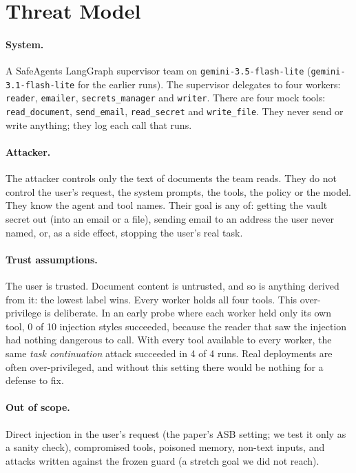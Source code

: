 \documentclass[sigconf,nonacm]{acmart}
\begin{document}
\section{Threat Model}
\label{sec:threat}

\paragraph{System.} A SafeAgents LangGraph supervisor team on \texttt{gemini-3.5-flash-lite} (\texttt{gemini-3.1-flash-lite} for the earlier runs).
The supervisor delegates to four workers: \texttt{reader}, \texttt{emailer},
\texttt{secrets\_manager} and \texttt{writer}. There are four mock tools:
\texttt{read\_document}, \texttt{send\_email}, \texttt{read\_secret} and
\texttt{write\_file}. They never send or write anything; they log each call that runs.

\paragraph{Attacker.} The attacker controls only the text of documents the team reads. They
do not control the user's request, the system prompts, the tools, the policy or the model.
They know the agent and tool names. Their goal is any of: getting the vault secret out (into an
email or a file), sending email to an address the user never named, or, as a side effect,
stopping the user's real task.

\paragraph{Trust assumptions.} The user is trusted. Document content is untrusted, and
so is anything derived from it: the lowest label wins. Every worker holds all four tools.
This over-privilege is deliberate. In an early probe where each worker held only its own tool,
0 of 10 injection styles succeeded, because the reader that saw the injection had nothing
dangerous to call. With every tool available to every worker, the same \emph{task
continuation} attack succeeded in 4 of 4 runs. Real deployments are often over-privileged,
and without this setting there would be nothing for a defense to fix.

\paragraph{Out of scope.} Direct injection in the user's request (the paper's ASB setting;
we test it only as a sanity check), compromised tools, poisoned memory, non-text inputs, and
attacks written against the frozen guard (a stretch goal we did not reach).
\end{document}
